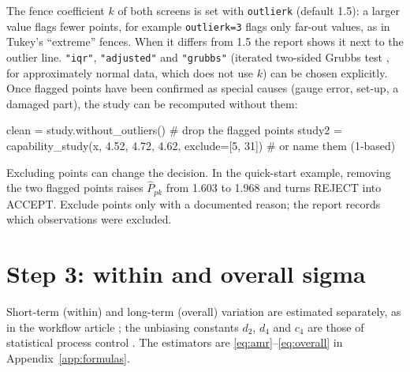 \documentclass[a4paper,11pt,oneside,openany,parskip=half-,headings=standardclasses,toc=flat,numbers=noenddot]{scrbook}
\newcommand{\code}[1]{\texttt{\begingroup\def\_{\textunderscore\allowbreak}#1\endgroup}}
\newcommand{\Ppkhat}{\widehat{P}_{pk}}
\begin{document}
The fence coefficient $k$ of both screens is set with \code{outlier\_k} (default 1.5): a larger value
flags fewer points, for example \code{outlier\_k=3} flags only far-out values, as in Tukey's
``extreme'' fences. When it differs from 1.5 the report shows it next to the outlier line.
\code{"iqr"}, \code{"adjusted"} and \code{"grubbs"} (iterated two-sided Grubbs test \cite{grubbs}, for approximately
normal data, which does not use $k$) can be chosen explicitly. Once flagged points have been confirmed as special causes
(gauge error, set-up, a damaged part), the study can be recomputed without them:

\begin{pycode}
clean  = study.without_outliers()                      # drop the flagged points
study2 = capability_study(x, 4.52, 4.72, 4.62, exclude=[5, 31])   # or name them (1-based)
\end{pycode}

\begin{caution}
Excluding points can change the decision. In the quick-start example, removing the two flagged points
raises $\Ppkhat$ from 1.603 to 1.968 and turns REJECT into ACCEPT. Exclude points only with a
documented reason; the report records which observations were excluded.
\end{caution}

\section{Step 3: within and overall sigma}\label{sec:sigma}

Short-term (within) and long-term (overall) variation are estimated separately, as in the workflow
article \cite[Sec.~5]{jy-workflow}; the unbiasing constants $d_2$, $d_4$ and $c_4$ are those of
statistical process control \cite{montgomery}. The estimators are \eqref{eq:amr}--\eqref{eq:overall} in
Appendix~\ref{app:formulas}.
\end{document}
